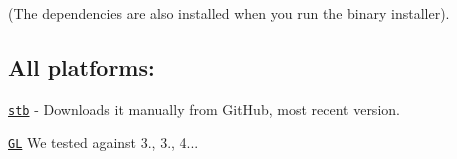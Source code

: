 (The dependencies are also installed when you run the binary installer).

\subsection*{All platforms\-:}

\href{https://github.com/nothings/stb/archive/master.zip}{\tt stb} -\/ Downloads it manually from Git\-Hub, most recent version.

\href{https://www.opengl.org/}{\tt G\-L} We tested against 3., 3., 4... 